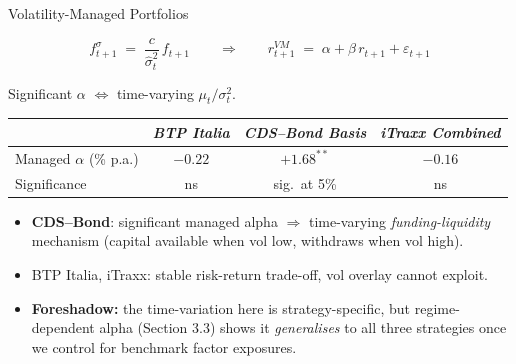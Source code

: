 \documentclass[aspectratio=169,11pt]{beamer}
\newcommand{\hlt}[1]{\textcolor{edhecred}{\textbf{#1}}}     %
\newcommand{\hltb}[1]{\textcolor{accentblue}{\textbf{#1}}}  %
\begin{document}
\begin{frame}[t]{Volatility-Managed Portfolios \citep{moreira2017volatility}}
\centering
\small
\vspace{0.10cm}

\[
  f^{\sigma}_{t+1} \;=\; \frac{c}{\hat{\sigma}^2_t}\, f_{t+1}
  \qquad\Longrightarrow\qquad
  r^{VM}_{t+1} \;=\; \alpha + \beta\, r_{t+1} + \varepsilon_{t+1}
\]

{\footnotesize Significant $\alpha$ $\Leftrightarrow$ time-varying $\mu_t/\sigma_t^2$.}

\vspace{0.30cm}

\renewcommand{\arraystretch}{1.20}
\setlength{\tabcolsep}{10pt}
\begin{tabular}{lccc}
\toprule
 & \textit{BTP Italia} & \textit{CDS--Bond Basis} & \textit{iTraxx Combined} \\
\midrule
Managed $\alpha$ (\% p.a.) & $-0.22$ & \hlt{$+1.68^{**}$} & $-0.16$ \\
Significance               & ns      & sig.\ at 5\%      & ns      \\
\bottomrule
\end{tabular}

\vspace{0.45cm}

\begin{itemize}\itemsep=0.10cm\small
  \item \hlt{CDS--Bond}: significant managed alpha
        $\Rightarrow$ time-varying \emph{funding-liquidity} mechanism
        (capital available when vol low, withdraws when vol high).
  \item BTP Italia, iTraxx: stable risk-return trade-off, vol overlay
        cannot exploit.
  \item \hltb{Foreshadow:} the time-variation here is strategy-specific, but
        regime-dependent alpha (Section 3.3) shows it
        \emph{generalises} to all three strategies once we control for benchmark
        factor exposures.
\end{itemize}

\end{frame}

\end{document}
